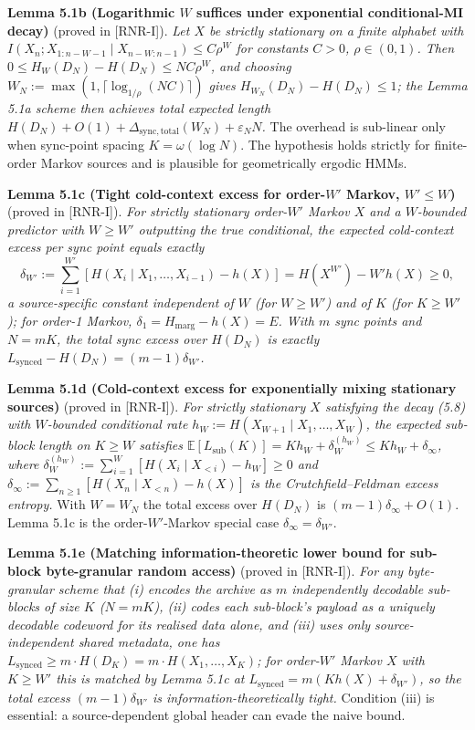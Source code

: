 \documentclass[
]{article}
\begin{document}
\textbf{Lemma 5.1b (Logarithmic $W$ suffices under exponential
conditional-MI decay)} (proved in [RNR-I]). \emph{Let $X$ be strictly
stationary on a finite alphabet with
$I(X_n; X_{1:n-W-1} \mid X_{n-W:n-1}) \le C\rho^W$ for constants $C>0$,
$\rho\in(0,1)$. Then $0 \le H_W(D_N) - H(D_N) \le N C \rho^W$, and choosing
$W_N := \max(1, \lceil \log_{1/\rho}(NC)\rceil)$ gives
$H_{W_N}(D_N) - H(D_N) \le 1$; the Lemma 5.1a scheme then achieves total
expected length $H(D_N) + O(1) + \Delta_{\mathrm{sync,total}}(W_N) +
\varepsilon_N N$.} The overhead is sub-linear only when sync-point spacing
$K = \omega(\log N)$. The hypothesis holds strictly for finite-order Markov
sources and is plausible for geometrically ergodic HMMs.

\textbf{Lemma 5.1c (Tight cold-context excess for order-$W'$ Markov,
$W' \le W$)} (proved in [RNR-I]). \emph{For strictly stationary order-$W'$
Markov $X$ and a $W$-bounded predictor with $W \ge W'$ outputting the true
conditional, the expected cold-context excess per sync point equals
exactly}
\[
\delta_{W'} := \sum_{i=1}^{W'}[H(X_i \mid X_1,\dots,X_{i-1}) - h(X)]
= H(X^{W'}) - W' h(X) \ge 0,
\]
\emph{a source-specific constant independent of $W$ (for $W \ge W'$) and of
$K$ (for $K \ge W'$); for order-1 Markov, $\delta_1 = H_{\mathrm{marg}} -
h(X) = E$. With $m$ sync points and $N = mK$, the total sync excess over
$H(D_N)$ is exactly $L_{\mathrm{synced}} - H(D_N) = (m-1)\delta_{W'}$.}

\textbf{Lemma 5.1d (Cold-context excess for exponentially mixing
stationary sources)} (proved in [RNR-I]). \emph{For strictly stationary
$X$ satisfying the decay (5.8) with $W$-bounded conditional rate
$h_W := H(X_{W+1}\mid X_1,\dots,X_W)$, the expected sub-block length on
$K \ge W$ satisfies $\mathbb{E}[L_{\mathrm{sub}}(K)] = K h_W +
\delta_W^{(h_W)} \le K h_W + \delta_\infty$, where
$\delta_W^{(h_W)} := \sum_{i=1}^W [H(X_i\mid X_{<i}) - h_W] \ge 0$ and
$\delta_\infty := \sum_{n\ge 1}[H(X_n\mid X_{<n}) - h(X)]$ is the
Crutchfield--Feldman excess entropy.} With $W = W_N$ the total excess over
$H(D_N)$ is $(m-1)\delta_\infty + O(1)$. Lemma 5.1c is the order-$W'$-Markov
special case $\delta_\infty = \delta_{W'}$.

\textbf{Lemma 5.1e (Matching information-theoretic lower bound for
sub-block byte-granular random access)} (proved in [RNR-I]). \emph{For any
byte-granular scheme that (i) encodes the archive as $m$ independently
decodable sub-blocks of size $K$ ($N = mK$), (ii) codes each sub-block's
payload as a uniquely decodable codeword for its realised data alone, and
(iii) uses only source-independent shared metadata, one has
$L_{\mathrm{synced}} \ge m\cdot H(D_K) = m\cdot H(X_1,\dots,X_K)$; for
order-$W'$ Markov $X$ with $K \ge W'$ this is matched by Lemma 5.1c at
$L_{\mathrm{synced}} = m(K h(X) + \delta_{W'})$, so the total excess
$(m-1)\delta_{W'}$ is information-theoretically tight.} Condition (iii) is
essential: a source-dependent global header can evade the naive bound.
\end{document}
